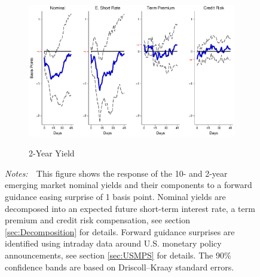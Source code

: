 \documentclass[a4paper, 12pt]{article}
\newcommand{\figtext}[1]{
	\vspace{-1ex}
	\captionsetup{justification=justified,font=footnotesize}
	\caption*{#1}
}
\newcommand{\fignotes}[1]{\figtext{\emph{Notes:~}~#1}}
\begin{document}
{\begin{landscape}
\begin{figure}[tbph]
\begin{center}
\begin{minipage}{\linewidth}
\begin{center}
						\begin{subfigure}[t]{\linewidth}
							\includegraphics[trim={0cm 0cm 0cm 0cm},clip,height=0.35\textheight,width=\linewidth]{../Figures/PathEMnomyptpphi24mPost.eps} \\
							\vspace{-0.35cm}
							\caption{2-Year Yield} \label{subfig:LPEM2YpathPost}
						\end{subfigure}
						\vspace{-0.45cm}
					\end{center}
					\fignotes{This figure shows the response of the 10- and 2-year emerging market nominal yields and their components to a forward guidance easing surprise of 1 basis point. Nominal yields are decomposed into an expected future short-term interest rate, a term premium and credit risk compensation, see section \ref{sec:Decomposition} for details. Forward guidance surprises are identified using intraday data around U.S. monetary policy announcements, see section \ref{sec:USMPS} for details. The 90\% confidence bands are based on Driscoll--Kraay standard errors.}
				\end{minipage}
			\end{center}
		\end{figure}
		
		\pagebreak[4]
		

\end{landscape}}
\end{document}
